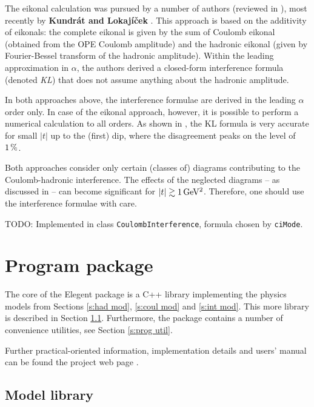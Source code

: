 \documentclass[preprint,12pt]{elsarticle}
\def\un#1{{\,\rm #1}}
\begin{document}
The eikonal calculation was pursued by a number of authors (reviewed in \cite[section 1.3.5]{jan_thesis}), most recently by {\bf Kundr\' at and Lokaj\' i\v cek} \cite{kl94}. This approach is based on the additivity of eikonals: the complete eikonal is given by the sum of Coulomb eikonal (obtained from the OPE Coulomb amplitude) and the hadronic eikonal (given by Fourier-Bessel transform of the hadronic amplitude). Within the leading approximation in $\alpha$, the authors derived a closed-form interference formula (denoted {\em KL}) that does not assume anything about the hadronic amplitude.

In both approaches above, the interference formulae are derived in the leading $\alpha$ order only. In case of the eikonal approach, however, it is possible to perform a numerical calculation to all orders. As shown in \cite[section 1.3.7]{jan_thesis}, the KL formula is very accurate for small $|t|$ up to the (first) dip, where the disagreement peaks on the level of $1\un{\%}$.

Both approaches consider only certain (classes of) diagrams contributing to the Coulomb-hadronic interference. The effects of the neglected diagrams -- as discussed in \cite[section 1.3.6]{jan_thesis} -- can become significant for $|t|\gtrsim 1\un{GeV^2}$. Therefore, one should use the interference formulae with care.

TODO: Implemented in class {\tt CoulombInterference}, formula chosen by {\tt ciMode}.


\section{Program package}\label{s:prog}

The core of the Elegent package is a C++ library implementing the physics models from Sections \ref{s:had mod}, \ref{s:coul mod} and \ref{s:int mod}. This more library is described in Section \ref{s:prog lib}. Furthermore, the package contains a number of convenience utilities, see Section \ref{s:prog util}.

Further practical-oriented information, implementation details and users' manual can be found the project web page \cite{elegent}.

\subsection{Model library}\label{s:prog lib} 
\end{document}
